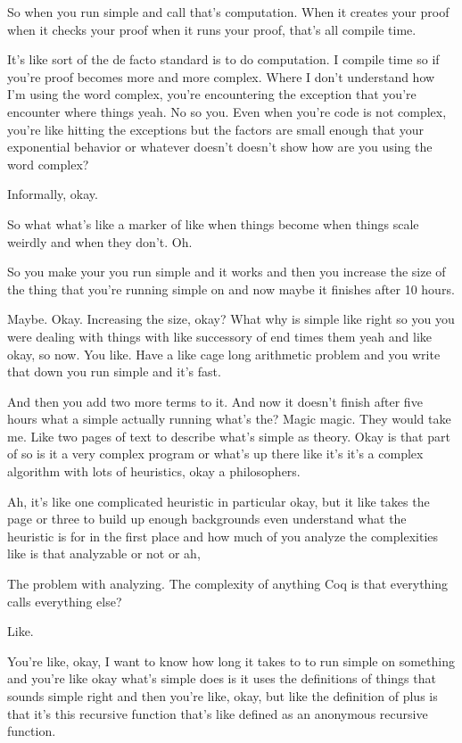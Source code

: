 \begin{subappendices}
    So when you run simple and call that's computation. When it creates your proof when it checks your proof when it runs your proof, that's all compile time. 
    
    It's like sort of the de facto standard is to do computation. I compile time so if you're proof becomes more and more complex. Where I don't understand how I'm using the word complex, you're encountering the exception that you're encounter where things yeah. No so you. Even when you're code is not complex, you're like hitting the exceptions but the factors are small enough that your exponential behavior or whatever doesn't doesn't show how are you using the word complex? 
    
    Informally, okay. 
    
    So what what's like a marker of like when things become when things scale weirdly and when they don't. Oh. 
    
    So you make your you run simple and it works and then you increase the size of the thing that you're running simple on and now maybe it finishes after 10 hours. 
    
    Maybe. Okay. Increasing the size, okay? What why is simple like right so you you were dealing with things with like successory of end times them yeah and like okay, so now. You like. Have a like cage long arithmetic problem and you write that down you run simple and it's fast. 
    
    And then you add two more terms to it. And now it doesn't finish after five hours what a simple actually running what's the? Magic magic. They would take me. Like two pages of text to describe what's simple as theory. Okay is that part of so is it a very complex program or what's up there like it's it's a complex algorithm with lots of heuristics, okay a philosophers. 
    
    Ah, it's like one complicated heuristic in particular okay, but it like takes the page or three to build up enough backgrounds even understand what the heuristic is for in the first place and how much of you analyze the complexities like is that analyzable or not or ah, 
    
    The problem with analyzing. The complexity of anything Coq is that everything calls everything else? 
    
    Like. 
    
    You're like, okay, I want to know how long it takes to to run simple on something and you're like okay what's simple does is it uses the definitions of things that sounds simple right and then you're like, okay, but like the definition of plus is that it's this recursive function that's like defined as an anonymous recursive function. 
    

\end{subappendices}
